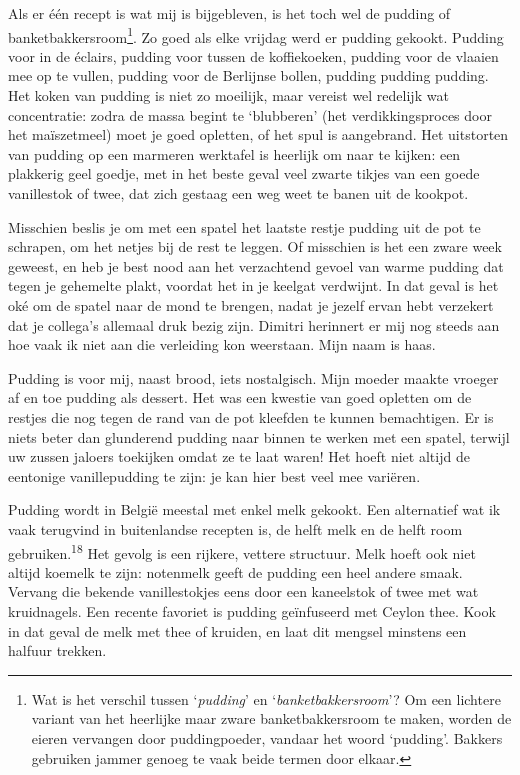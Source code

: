 \documentclass[
  11pt,
  dutch,
]{memoir}
\begin{document}
Als er één recept is wat mij is bijgebleven, is het toch wel de pudding
of banketbakkersroom\footnote{Wat is het verschil tussen
  `\emph{pudding}' en `\emph{banketbakkersroom}'? Om een lichtere
  variant van het heerlijke maar zware banketbakkersroom te maken,
  worden de eieren vervangen door puddingpoeder, vandaar het woord
  `pudding'. Bakkers gebruiken jammer genoeg te vaak beide termen door
  elkaar.}. Zo goed als elke vrijdag werd er pudding gekookt. Pudding
voor in de éclairs, pudding voor tussen de koffiekoeken, pudding voor de
vlaaien mee op te vullen, pudding voor de Berlijnse bollen, pudding
pudding pudding. Het koken van pudding is niet zo moeilijk, maar vereist
wel redelijk wat concentratie: zodra de massa begint te `blubberen' (het
verdikkingsproces door het maïszetmeel) moet je goed opletten, of het
spul is aangebrand. Het uitstorten van pudding op een marmeren werktafel
is heerlijk om naar te kijken: een plakkerig geel goedje, met in het
beste geval veel zwarte tikjes van een goede vanillestok of twee, dat
zich gestaag een weg weet te banen uit de kookpot.

Misschien beslis je om met een spatel het laatste restje pudding uit de
pot te schrapen, om het netjes bij de rest te leggen. Of misschien is
het een zware week geweest, en heb je best nood aan het verzachtend
gevoel van warme pudding dat tegen je gehemelte plakt, voordat het in je
keelgat verdwijnt. In dat geval is het oké om de spatel naar de mond te
brengen, nadat je jezelf ervan hebt verzekert dat je collega's allemaal
druk bezig zijn. Dimitri herinnert er mij nog steeds aan hoe vaak ik
niet aan die verleiding kon weerstaan. Mijn naam is haas.

Pudding is voor mij, naast brood, iets nostalgisch. Mijn moeder maakte
vroeger af en toe pudding als dessert. Het was een kwestie van goed
opletten om de restjes die nog tegen de rand van de pot kleefden te
kunnen bemachtigen. Er is niets beter dan glunderend pudding naar binnen
te werken met een spatel, terwijl uw zussen jaloers toekijken omdat ze
te laat waren! Het hoeft niet altijd de eentonige vanillepudding te
zijn: je kan hier best veel mee variëren.

Pudding wordt in België meestal met enkel melk gekookt. Een alternatief
wat ik vaak terugvind in buitenlandse recepten is, de helft melk en de
helft room gebruiken.\textsuperscript{18} Het gevolg is een rijkere,
vettere structuur. Melk hoeft ook niet altijd koemelk te zijn: notenmelk
geeft de pudding een heel andere smaak. Vervang die bekende
vanillestokjes eens door een kaneelstok of twee met wat kruidnagels. Een
recente favoriet is pudding geïnfuseerd met Ceylon thee. Kook in dat
geval de melk met thee of kruiden, en laat dit mengsel minstens een
halfuur trekken.
\end{document}
